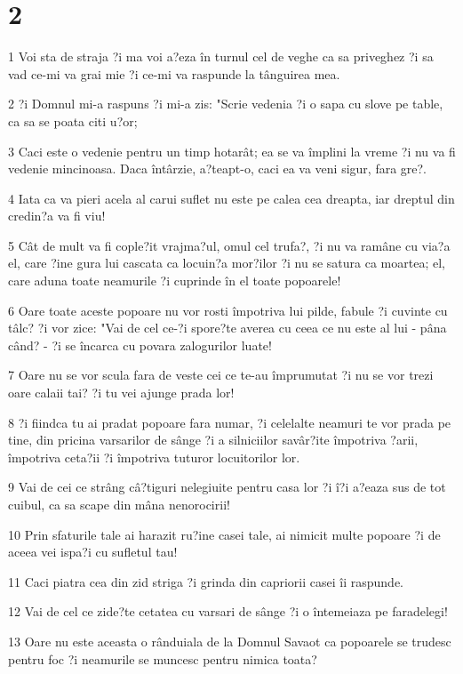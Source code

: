 \chapter{2}

\par 1 Voi sta de straja ?i ma voi a?eza în turnul cel de veghe ca sa priveghez ?i sa vad ce-mi va grai mie ?i ce-mi va raspunde la tânguirea mea.
\par 2 ?i Domnul mi-a raspuns ?i mi-a zis: "Scrie vedenia ?i o sapa cu slove pe table, ca sa se poata citi u?or;
\par 3 Caci este o vedenie pentru un timp hotarât; ea se va împlini la vreme ?i nu va fi vedenie mincinoasa. Daca întârzie, a?teapt-o, caci ea va veni sigur, fara gre?.
\par 4 Iata ca va pieri acela al carui suflet nu este pe calea cea dreapta, iar dreptul din credin?a va fi viu!
\par 5 Cât de mult va fi cople?it vrajma?ul, omul cel trufa?, ?i nu va ramâne cu via?a el, care ?ine gura lui cascata ca locuin?a mor?ilor ?i nu se satura ca moartea; el, care aduna toate neamurile ?i cuprinde în el toate popoarele!
\par 6 Oare toate aceste popoare nu vor rosti împotriva lui pilde, fabule ?i cuvinte cu tâlc? ?i vor zice: "Vai de cel ce-?i spore?te averea cu ceea ce nu este al lui - pâna când? - ?i se încarca cu povara zalogurilor luate!
\par 7 Oare nu se vor scula fara de veste cei ce te-au împrumutat ?i nu se vor trezi oare calaii tai? ?i tu vei ajunge prada lor!
\par 8 ?i fiindca tu ai pradat popoare fara numar, ?i celelalte neamuri te vor prada pe tine, din pricina varsarilor de sânge ?i a silniciilor savâr?ite împotriva ?arii, împotriva ceta?ii ?i împotriva tuturor locuitorilor lor.
\par 9 Vai de cei ce strâng câ?tiguri nelegiuite pentru casa lor ?i î?i a?eaza sus de tot cuibul, ca sa scape din mâna nenorocirii!
\par 10 Prin sfaturile tale ai harazit ru?ine casei tale, ai nimicit multe popoare ?i de aceea vei ispa?i cu sufletul tau!
\par 11 Caci piatra cea din zid striga ?i grinda din capriorii casei îi raspunde.
\par 12 Vai de cel ce zide?te cetatea cu varsari de sânge ?i o întemeiaza pe faradelegi!
\par 13 Oare nu este aceasta o rânduiala de la Domnul Savaot ca popoarele se trudesc pentru foc ?i neamurile se muncesc pentru nimica toata?
